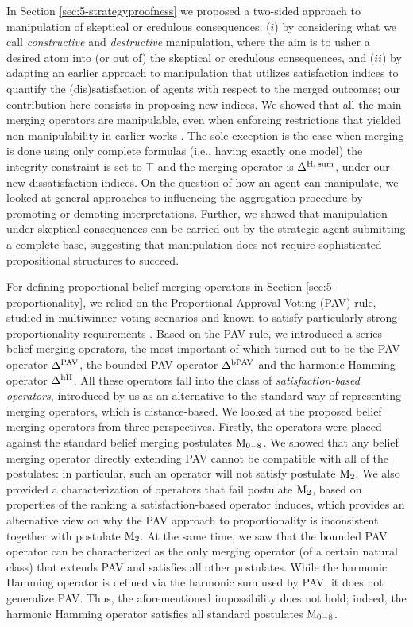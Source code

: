 In Section \ref{sec:5-strategyproofness}
we proposed a two-sided approach to manipulation of skeptical or credulous consequences:
($i$) by considering what we call \emph{constructive} and \emph{destructive} manipulation, 
where the aim is to usher a desired atom into (or out of) the skeptical or credulous consequences, and
($ii$) by adapting an earlier approach to manipulation \cite{EveraereKM07} 
that utilizes satisfaction indices to quantify the (dis)satisfaction of agents 
with respect to the merged outcomes; our contribution here consists in proposing new indices. 
We showed that all the main merging operators are manipulable, 
even when enforcing restrictions that 
yielded non-manipulability in earlier works \cite{EveraereKM07}.
The sole exception is the case when merging is done using only 
complete formulas (i.e., having exactly one model) 
the integrity constraint is set to $\top$ 
and the merging operator is $\Delta^{{\operatorname{H}},\:{\operatorname{sum}}}$, under our new dissatisfaction indices.
On the question of how an agent can manipulate, 
we looked at general approaches to influencing the aggregation procedure 
by promoting or demoting interpretations. 
Further, we showed that manipulation under skeptical consequences can be 
carried out by the strategic agent submitting a complete base, 
suggesting that manipulation does not require sophisticated propositional structures to succeed.

For defining proportional belief merging operators in Section \ref{sec:5-proportionality},
we relied on the Proportional Approval Voting (PAV) rule, 
studied in multiwinner voting scenarios and known to satisfy 
particularly strong proportionality requirements \cite{AzizBCEFW17}.
Based on the PAV rule, we introduced a series belief merging operators,
the most important of which turned out to be
the PAV operator $\Delta^{\mathrm{PAV}}$, 
the bounded PAV operator $\Delta^{\mathrm{bPAV}}$ 
and the harmonic Hamming operator $\Delta^{\mathrm{hH}}$.
All these operators fall into the class of \emph{satisfaction-based operators}, 
introduced by us as an alternative to the standard way of representing merging operators, 
which is distance-based.
We looked at the proposed belief merging operators from three perspectives.
Firstly, the operators were placed against
the standard belief merging postulates $\mathrm{M}_{0-8}$.
We showed that any belief merging operator directly extending 
PAV cannot be compatible with all of the postulates: 
in particular, such an operator will not satisfy postulate $\mathrm{M}_{2}$.
We also provided a characterization of operators that fail postulate $\mathrm{M}_{2}$,
based on properties of the ranking a satisfaction-based operator induces, 
which provides an alternative view on why 
the PAV approach to proportionality is inconsistent together with postulate $\mathrm{M}_{2}$.
At the same time, we saw that the bounded PAV operator can be characterized as the only merging operator 
(of a certain natural class) that extends PAV and satisfies all other postulates.
While the harmonic Hamming operator is defined via the harmonic sum used by PAV, 
it does not generalize PAV. 
Thus, the aforementioned impossibility does not hold; 
indeed, the harmonic Hamming operator satisfies all standard postulates $\mathrm{M}_{0-8}$.

